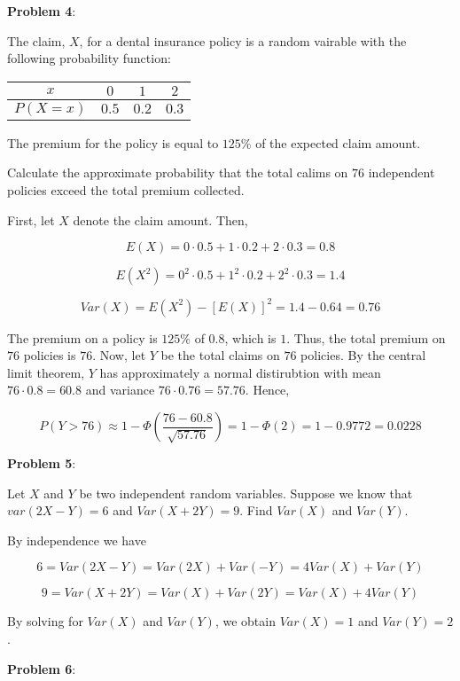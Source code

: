 \documentclass{article}
\begin{document}
\noindent\textbf{Problem 4}:

The claim, $X$, for a dental insurance policy is a random vairable with the following probability function:

\begin{center}
    \begin{tabular}{|c|c|c|c|}
        \hline
        $x$&$0$&$1$&$2$\\
        \hline
        $P(X=x)$&$0.5$&$0.2$&$0.3$\\
        \hline
    \end{tabular}
\end{center}

The premium for the policy is equal to $125\%$ of the expected claim amount.

Calculate the approximate probability that the total calims on $76$ independent policies exceed the total premium collected.

{\color{blue}

First, let $X$ denote the claim amount. Then,

\[E(X)=0\cdot0.5+1\cdot0.2+2\cdot0.3=0.8\]

\[E(X^2)=0^2\cdot0.5+1^2\cdot0.2+2^2\cdot0.3=1.4\]

\[Var(X)=E(X^2)-[E(X)]^2=1.4-0.64=0.76\]

The premium on a policy is $125\%$ of $0.8$, which is $1$. Thus, the total premium on $76$ policies is $76$. Now, let $Y$ be the total claims on $76$ policies. By the central limit theorem, $Y$ has approximately a normal distirubtion with mean $76\cdot0.8=60.8$ and variance $76\cdot0.76=57.76$. Hence,

\[P(Y>76)\approx1-\Phi(\frac{76-60.8}{\sqrt{57.76}})=1-\Phi(2)=1-0.9772=0.0228\]

}

\noindent\textbf{Problem 5}:

Let $X$ and $Y$ be two independent random variables. Suppose we know that $var(2X-Y)=6$ and $Var(X+2Y)=9$. Find $Var(X)$ and $Var(Y)$.

{\color{blue}

By independence we have

\[6=Var(2X-Y)=Var(2X)+Var(-Y)=4Var(X)+Var(Y)\]

\[9=Var(X+2Y)=Var(X)+Var(2Y)=Var(X)+4Var(Y)\]

By solving for $Var(X)$ and $Var(Y)$, we obtain $Var(X)=1$ and $Var(Y)=2$.

}

\noindent\textbf{Problem 6}:
\end{document}
